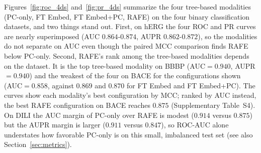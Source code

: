 \documentclass[pdflatex,sn-mathphys-num]{sn-jnl}%
\begin{document}
\begin{table}[!ht]
\centering
\caption{Best configurations on DILI (binary, drug-induced liver injury, TDC ADMET Group).}
\label{tab:dili}
\end{table}

Figures~\ref{fig:roc_4ds} and~\ref{fig:pr_4ds} summarize the four tree-based modalities (PC-only, FT Embed, FT Embed+PC, RAFE) on the four binary classification datasets, and two things stand out. First, on hERG the four ROC and PR curves are nearly superimposed (AUC $0.864$-$0.874$, AUPR $0.862$-$0.872$), so the modalities do not separate on AUC even though the paired MCC comparison finds RAFE below PC-only. Second, RAFE's rank among the tree-based modalities depends on the dataset. It is the top tree-based modality on BBBP (AUC$=0.940$, AUPR$=0.940$) and the weakest of the four on BACE for the configurations shown (AUC$=0.858$, against $0.869$ and $0.870$ for FT Embed and FT Embed+PC). The curves show each modality's best configuration by MCC; ranked by AUC instead, the best RAFE configuration on BACE reaches $0.875$ (Supplementary Table~S4). On DILI the AUC margin of PC-only over RAFE is modest ($0.914$ versus $0.875$) but the AUPR margin is larger ($0.911$ versus $0.847$), so ROC-AUC alone understates how favorable PC-only is on this small, imbalanced test set (see also Section~\ref{sec:metrics}).
\end{document}
